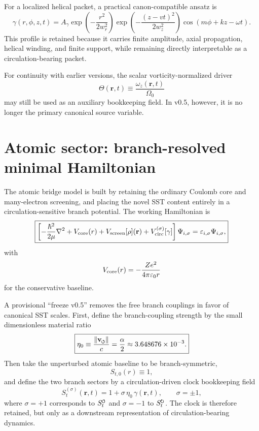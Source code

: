 \documentclass[11pt,a4paper]{article}
\newcommand{\swirlarrow}{\mathchoice{\mkern-2mu\scriptstyle\boldsymbol{\circlearrowleft}}{\mkern-2mu\scriptstyle\boldsymbol{\circlearrowleft}}{\mkern-2mu\scriptscriptstyle\boldsymbol{\circlearrowleft}}{\mkern-2mu\scriptscriptstyle\boldsymbol{\circlearrowleft}}}
\newcommand{\swirlarrowcw}{\mathchoice{\mkern-2mu\scriptstyle\boldsymbol{\circlearrowright}}{\mkern-2mu\scriptstyle\boldsymbol{\circlearrowright}}{\mkern-2mu\scriptscriptstyle\boldsymbol{\circlearrowright}}{\mkern-2mu\scriptscriptstyle\boldsymbol{\circlearrowright}}}
\newcommand{\vswirl}{\mathbf{v}_{\swirlarrow}}
\newcommand{\SwirlClock}{S_t^{\swirlarrow}}
\newcommand{\SwirlClockcw}{S_t^{\swirlarrowcw}}
\begin{document}
For a localized helical packet, a practical canon-compatible ansatz is
\begin{equation}
\label{eq:gammaPacket}
\gamma(r,\phi,z,t)
=
A_\gamma
\exp\!\left(-\frac{r^2}{2w_r^2}\right)
\exp\!\left(-\frac{(z-vt)^2}{2w_z^2}\right)
\cos\!\left(m\phi+kz-\omega t\right).
\end{equation}
This profile is retained because it carries finite amplitude, axial propagation, helical winding, and finite support, while remaining directly interpretable as a circulation-bearing packet.

For continuity with earlier versions, the scalar vorticity-normalized driver
\begin{equation}
\label{eq:ThetaDef}
\Theta(\mathbf r,t) \equiv \frac{\omega_z(\mathbf r,t)}{\Omega_0}
\end{equation}
may still be used as an auxiliary bookkeeping field. In v0.5, however, it is no longer the primary canonical source variable.

\section{Atomic sector: branch-resolved minimal Hamiltonian}
The atomic bridge model is built by retaining the ordinary Coulomb core and many-electron screening, and placing the novel SST content entirely in a circulation-sensitive branch potential. The working Hamiltonian is
\begin{equation}
\label{eq:master-H}
\boxed{
\left[
-\frac{\hbar^2}{2\mu}\nabla^2
+V_{\rm core}(r)
+V_{\rm screen}[\rho](\mathbf r)
+V_{\rm circ}^{(\sigma)}[\gamma]
\right]\Psi_{i,\sigma}
=\varepsilon_{i,\sigma}\Psi_{i,\sigma},
}
\end{equation}
with
\begin{equation}
\label{eq:Vcore}
V_{\rm core}(r)=-\frac{Ze^2}{4\pi\varepsilon_0 r}
\end{equation}
for the conservative baseline.

A provisional ``freeze v0.5'' removes the free branch couplings in favor of canonical SST scales. First, define the branch-coupling strength by the small dimensionless material ratio
\begin{equation}
\label{eq:eta0}
\boxed{
\eta_0 \equiv \frac{\lVert\vswirl\rVert}{c} = \frac{\alpha}{2} \approx 3.648676\times 10^{-3}.
}
\end{equation}
Then take the unperturbed atomic baseline to be branch-symmetric,
\begin{equation}
\label{eq:St0freeze}
S_{t,0}(r)\equiv 1,
\end{equation}
and define the two branch sectors by a circulation-driven clock bookkeeping field
\begin{equation}
\label{eq:StBranches}
\boxed{
S_t^{(\sigma)}(\mathbf r,t)=1+\sigma\,\eta_0\,\gamma(\mathbf r,t),
\qquad
\sigma=\pm 1,
}
\end{equation}
where $\sigma=+1$ corresponds to $\SwirlClock$ and $\sigma=-1$ to $\SwirlClockcw$. The clock is therefore retained, but only as a downstream representation of circulation-bearing dynamics.
\end{document}

